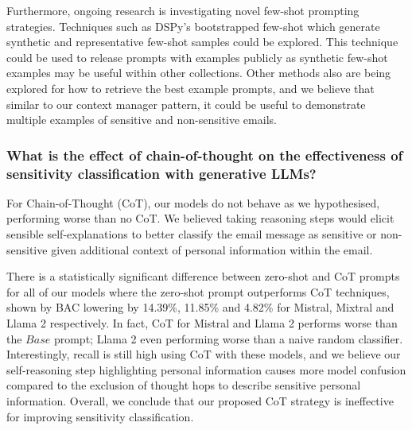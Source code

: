 Furthermore, ongoing research is investigating novel few-shot prompting strategies. Techniques such as DSPy’s bootstrapped few-shot which generate synthetic and representative few-shot samples could be explored. This technique could be used to release prompts with examples publicly as synthetic few-shot examples may be useful within other collections. Other methods also are being explored for how to retrieve the best example prompts, and we believe that similar to our context manager pattern, it could be useful to demonstrate multiple examples of sensitive and non-sensitive emails.

\subsubsection{What is the effect of chain-of-thought on the effectiveness of sensitivity classification with generative LLMs?}

For Chain-of-Thought (CoT), our models do not behave as we hypothesised, performing worse than no CoT. We believed taking reasoning steps would elicit sensible self-explanations to better classify the email message as sensitive or non-sensitive given additional context of personal information within the email.

There is a statistically significant difference between zero-shot and CoT prompts for all of our models where the zero-shot prompt outperforms CoT techniques, shown by BAC lowering by 14.39\%, 11.85\% and 4.82\% for Mistral, Mixtral and Llama 2 respectively. In fact, CoT for Mistral and Llama 2 performs worse than the $Base$ prompt; Llama 2 even performing worse than a naive random classifier. Interestingly, recall is still high using CoT with these models, and we believe our self-reasoning step highlighting personal information causes more model confusion compared to the exclusion of thought hops to describe sensitive personal information. Overall, we conclude that our proposed CoT strategy is ineffective for improving sensitivity classification.

